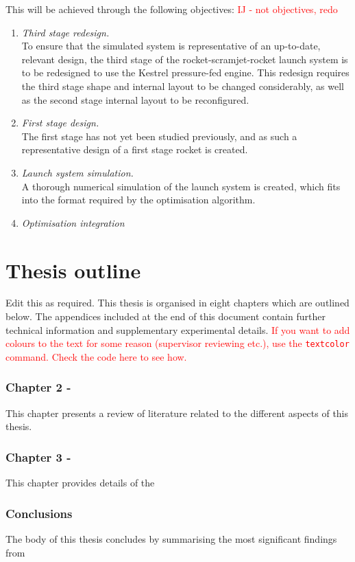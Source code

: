     \noindent This will be achieved through the following objectives:
 \textcolor{red}{IJ - not objectives, redo}
    \begin{enumerate}
    	 \item \emph{Third stage redesign.}\\
    	 To ensure that the simulated system is representative of an up-to-date, relevant design,
    	 the third stage of the rocket-scramjet-rocket launch system is to be redesigned to use the Kestrel pressure-fed engine. This redesign requires the third stage  shape and internal layout to be changed considerably, as well as the second stage internal layout to be reconfigured. 

\item \emph{First stage design.}\\
		The first stage has not yet been studied previously, and as such a representative design of a first stage rocket is created. 
    	
      \item \emph{Launch system simulation.}\\
      A thorough numerical simulation of the launch system is created, which fits into the format required by the optimisation algorithm. 

      \item \emph{Optimisation integration}\\



    \end{enumerate}

  \clearpage
  \section{Thesis outline}

    Edit this as required. This thesis is organised in eight chapters which are outlined below. The appendices included at the end of this document contain further technical information and supplementary experimental details. \textcolor{red}{If you want to add colours to the text for some reason (supervisor reviewing etc.), use the \texttt{textcolor} command. Check the code here to see how.}

    \subsubsection*{Chapter 2 -}

      This chapter presents a review of literature related to the different aspects of this thesis. 

    \subsubsection*{Chapter 3 - }

      This chapter provides details of the 

    \subsubsection*{Conclusions}

      The body of this thesis concludes by summarising the most significant findings from
